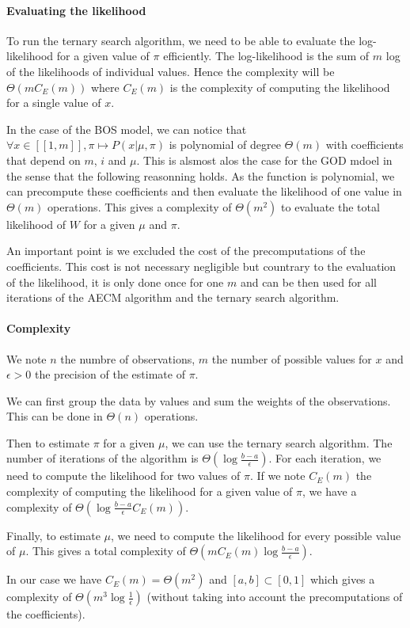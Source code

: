 \paragraph{Evaluating the likelihood}

To run the ternary search algorithm, we need to be able to evaluate the log-likelihood for a given value of $\pi$ efficiently.
The log-likelihood is the sum of $m$ log of the likelihoods of individual values.
Hence the complexity will be $\Theta(m C_E(m))$ where $C_E(m)$ is the complexity of computing the likelihood for a single value of $x$.

In the case of the BOS model, we can notice that $\forall x \in [[1, m]], \pi \mapsto P(x | \mu, \pi)$ is polynomial of degree $\Theta(m)$ with coefficients that depend on $m$, $i$ and $\mu$. This is alsmost alos the case for the GOD mdoel in the sense that the following reasonning holds. As the function is polynomial, we can precompute these coefficients and then evaluate the likelihood of one value in $\Theta(m)$ operations. This gives a complexity of $\Theta(m^2)$ to evaluate the total likelihood of $W$ for a given $\mu$ and $\pi$. 

An important point is we excluded the cost of the precomputations of the coefficients. This cost is not necessary negligible but countrary to the evaluation of the likelihood, it is only done once for one $m$ and can be then used for all iterations of the AECM algorithm and the ternary search algorithm.


\paragraph{Complexity}

We note $n$ the numbre of observations, $m$ the number of possible values for $x$ and $\epsilon > 0$ the precision of the estimate of $\pi$.

We can first group the data by values and sum the weights of the observations. This can be done in $\Theta(n)$ operations.

Then to estimate $\pi$ for a given $\mu$, we can use the ternary search algorithm. The number of iterations of the algorithm is $\Theta(\log \frac{b - a}{\epsilon})$. For each iteration, we need to compute the likelihood for two values of $\pi$. If we note $C_E(m)$ the complexity of computing the likelihood for a given value of $\pi$, we have a complexity of $\Theta(\log \frac{b - a}{\epsilon} C_E(m))$.

Finally, to estimate $\mu$, we need to compute the likelihood for every possible value of $\mu$. This gives a total complexity of $\Theta(m C_E(m) \log \frac{b - a}{\epsilon} )$.

In our case we have $C_E(m) = \Theta(m^2)$ and $[a, b] \subset [0, 1]$ which gives a complexity of $\Theta(m^3 \log \frac{1}{\epsilon})$ (without taking into account the precomputations of the coefficients).
